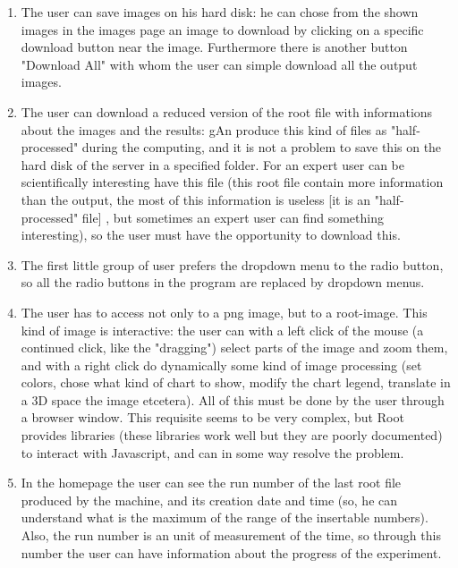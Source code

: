 \begin{enumerate}
\begin{enumerate}
\item The user can save images on his hard disk: he can chose from the shown images in the images page an image to download by clicking on a specific download button near the image. Furthermore there is another button "Download All" with whom the user can simple download all the output images.

\item The user can download a reduced version of the root file with informations about the images and the results: gAn produce this kind of files as "half-processed" during the computing, and it is not a problem to save this on the hard disk of the server in a specified folder. For an expert user can be scientifically interesting have this file (this root file contain more information than the output, the most of this information is useless [it is an "half-processed" file] , but sometimes an expert user can find something interesting), so the user must have the opportunity to download this.     

\item The first little group of user prefers the dropdown menu to the radio button, so all the radio buttons in the program are replaced by dropdown menus.

\item The user has to access not only to a png image, but to a root-image. This kind of image is interactive: the user can with a left click of the mouse (a continued click, like the "dragging") select parts of the image and zoom them, and with a right click do dynamically some kind of image processing (set colors, chose  what kind of chart to show, modify the chart legend, translate in a 3D space the image etcetera). All of this must be done by the user through a browser window.  This requisite seems to be very complex, but Root provides libraries (these libraries work well but they are poorly documented) to interact with Javascript, and can in some way resolve the problem.  

\item In the homepage the user can see the run number of the last root file produced by the machine, and its creation date and time (so, he can understand what is the maximum of the range of the insertable numbers). Also, the run number is an unit of measurement of the time, so through this number the user can have information about the progress of the experiment.  


\end{enumerate}
\end{enumerate}
